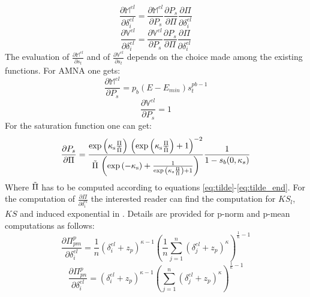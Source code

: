 \begin{equation}
  \frac{\partial \mathbb{M}^{el}}{\partial \delta_i^{el}} =\frac{\partial \mathbb{M}^{el}}{\partial P_s}\frac{\partial P_s}{\partial \Pi}\frac{\partial \Pi}{\partial\delta_i^{el}}
\end{equation}
\begin{equation}
  \frac{\partial \mathbb{V}^{el}}{\partial \delta_i^{el}} =\frac{\partial \mathbb{V}^{el}}{\partial P_s}\frac{\partial P_s}{\partial \Pi}\frac{\partial \Pi}{\partial\delta_i^{el}}
\end{equation}
The evaluation of $\frac{\partial \mathbb{M}^{el}}{\partial s_t}$ and of $\frac{\partial \mathbb{V}^{el}}{\partial s_t}$ depends on the choice made among the existing functions. For AMNA one gets:
\begin{equation}
\frac{\partial \mathbb{M}^{el}}{\partial P_s}=p_b(E-E_{min})s_t^{pb-1}   
\end{equation}
\begin{equation}
\frac{\partial \mathbb{V}^{el}}{\partial P_s}=1   
\end{equation}
For the saturation function one can get:
\begin{equation}
    \frac{\partial P_s}{\partial \Pi}=\frac{\exp\left(\mathrm{\kappa_s}{\frac{\mathrm{\Pi}}{\Tilde{\Pi}}}\right)\,{\left(\exp{\left(\mathrm{\kappa_s}\frac{\mathrm{\Pi}}{\Tilde{\Pi}}\right)}+1\right)}^{-2}}{\Tilde{\Pi}\,\left(\exp{\left(-\mathrm{\kappa_s}\right)}+\frac{1}{\exp{\left(\mathrm{\kappa_s}\frac{\mathrm{\Pi}}{\Tilde{\Pi}}\right)}+1}\right)}\frac{1}{1-s_b(0,\kappa_s)}
\end{equation}
Where $\Tilde{\Pi}$ has to be computed according to equations \eqref{eq:tilde}-\eqref{eq:tilde_end}.
For the computation of $\frac{\partial \Pi}{\partial\delta_i^{el}}$ the interested reader can find the computation for $KS_l$, $KS$ and induced exponential in \cite{kennedy2015improved}. Details are provided for p-norm and p-mean computations as follows:
\begin{equation}
    \frac{\partial \Pi_{pm}^p}{\partial\delta_i^{el}}=\frac{1}{n}\left(\delta_i^{el}+z_p\right)^{\kappa-1}\left(\frac{1}{n}\sum_{j=1}^n{\left(\delta_j^{el}+z_p\right)^{\kappa}}\right)^{\frac{1}{\kappa}-1}
\end{equation}
\begin{equation}
    \frac{\partial \Pi_{pn}^p}{\partial\delta_i^{el}}=\left(\delta_i^{el}+z_p\right)^{\kappa-1}\left(\sum_{j=1}^n{\left(\delta_j^{el}+z_p\right)^{\kappa}}\right)^{\frac{1}{\kappa}-1}
\end{equation}
